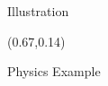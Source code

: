 \documentclass[final]{beamer}
\begin{document}
\begin{frame}{}
\begin{textblock}{0.32}
\begin{block}{Illustration \phantom{p}}
\begin{figure}
\end{figure}

\end{block}

\end{textblock}



\begin{textblock}{0.32}(0.67,0.14)

\begin{block}{Physics Example \phantom{p}}


\end{block}
\end{textblock}
\end{frame}
\end{document}
